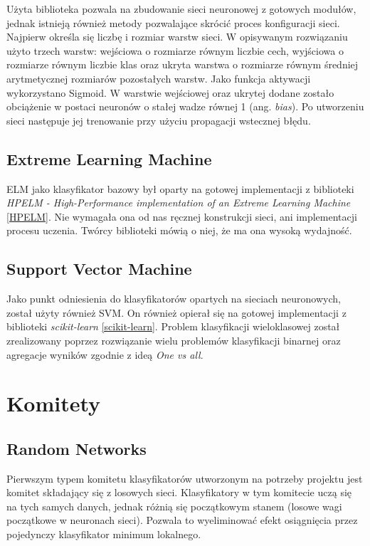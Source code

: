 \documentclass[11pt, a4paper, titlepage]{report}
\begin{document}
Użyta biblioteka pozwala na zbudowanie sieci neuronowej z gotowych modułów, jednak istnieją również metody pozwalające skrócić proces konfiguracji sieci. Najpierw określa się liczbę i rozmiar warstw sieci. W opisywanym rozwiązaniu użyto trzech warstw: wejściowa o rozmiarze równym liczbie cech, wyjściowa o rozmiarze równym liczbie klas oraz ukryta warstwa o rozmiarze równym średniej arytmetycznej rozmiarów pozostałych warstw. Jako funkcja aktywacji wykorzystano Sigmoid. W warstwie wejściowej oraz ukrytej dodane zostało obciążenie w postaci neuronów o stałej wadze równej 1 (ang. \textit{bias}).
Po utworzeniu sieci następuje jej trenowanie przy użyciu propagacji wstecznej błędu.

\subsection{Extreme Learning Machine}
ELM jako klasyfikator bazowy był oparty na gotowej implementacji z biblioteki \textit{HPELM - High-Performance implementation of an Extreme Learning Machine} \ref{HPELM}. Nie wymagała ona od nas ręcznej konstrukcji sieci, ani implementacji procesu uczenia. Twórcy biblioteki mówią o niej, że ma ona wysoką wydajność.

\subsection{Support Vector Machine}
Jako punkt odniesienia do klasyfikatorów opartych na sieciach neuronowych, został użyty również SVM. On również opierał się na gotowej implementacji z biblioteki \textit{scikit-learn} \ref{scikit-learn}. Problem klasyfikacji wieloklasowej został zrealizowany poprzez rozwiązanie wielu problemów klasyfikacji binarnej oraz agregacje wyników zgodnie z ideą \textit{One vs all}.

\section{Komitety}
\subsection{Random Networks}
Pierwszym typem komitetu klasyfikatorów utworzonym na potrzeby projektu jest komitet składający się z losowych sieci. Klasyfikatory w tym komitecie uczą się na tych samych danych, jednak różnią się początkowym stanem (losowe wagi początkowe w neuronach sieci). Pozwala to wyeliminować efekt osiągnięcia przez pojedynczy klasyfikator minimum lokalnego. 
\end{document}

